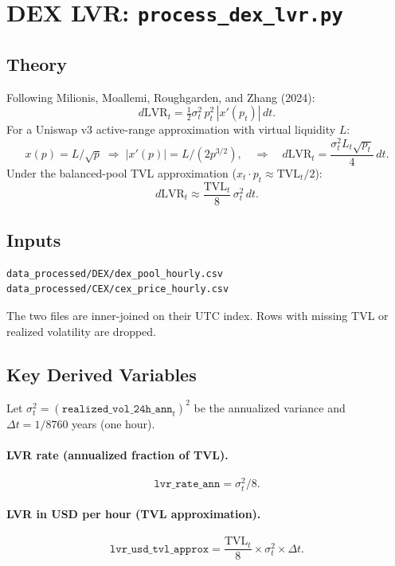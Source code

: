 \documentclass[11pt,a4paper]{article}
\begin{document}
\section{DEX LVR: \texttt{process\_dex\_lvr.py}}
\label{sec:lvr}

\subsection{Theory}

Following Milionis, Moallemi, Roughgarden, and Zhang (2024):
\[
  d\mathrm{LVR}_t = \tfrac{1}{2} \sigma_t^2\, p_t^2\, |x'(p_t)|\, dt.
\]
For a Uniswap v3 active-range approximation with virtual liquidity $L$:
\[
  x(p) = L / \sqrt{p} \;\Rightarrow\; |x'(p)| = L / (2 p^{3/2}),
  \quad\Rightarrow\quad
  d\mathrm{LVR}_t = \frac{\sigma_t^2 L_t \sqrt{p_t}}{4}\, dt.
\]
Under the balanced-pool TVL approximation
($x_t \cdot p_t \approx \mathrm{TVL}_t / 2$):
\[
  \boxed{d\mathrm{LVR}_t \approx \frac{\mathrm{TVL}_t}{8}\,\sigma_t^2\, dt.}
\]

\subsection{Inputs}

\begin{lstlisting}
data_processed/DEX/dex_pool_hourly.csv
data_processed/CEX/cex_price_hourly.csv
\end{lstlisting}

The two files are inner-joined on their UTC index. Rows with missing TVL
or realized volatility are dropped.

\subsection{Key Derived Variables}

Let $\sigma_t^2 =
(\texttt{realized\_vol\_24h\_ann}_t)^2$ be the annualized variance
and $\Delta t = 1/8760$ years (one hour).

\paragraph{LVR rate (annualized fraction of TVL).}
\[
  \texttt{lvr\_rate\_ann} = \sigma^2_t / 8.
\]

\paragraph{LVR in USD per hour (TVL approximation).}
\[
  \texttt{lvr\_usd\_tvl\_approx} =
  \frac{\mathrm{TVL}_t}{8} \times \sigma^2_t \times \Delta t.
\]
\end{document}
